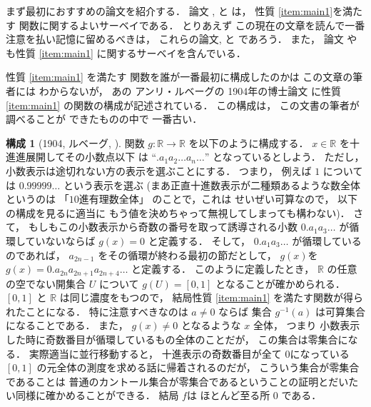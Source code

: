 \documentclass[leqno, a4paper, 12pt]{jsarticle}
\theoremstyle{definition}
\newtheorem{con}[thm]{構成}
\newcommand{\rr}{\mathbb{R}}
\begin{document}
まず最初におすすめの論文を紹介する．
論文
\cite{MR0104770}, 
\cite{MR3815388}
と
\cite{MR3293811}
は，
性質
\ref{item:main1}を満たす
関数に関するよいサーベイである．
とりあえず
この現在の文章を読んで一番注意を払い記憶に留めるべきは，
これらの論文\cite{MR0104770}, 
\cite{MR3815388}
と
\cite{MR3293811}であろう．
また，
論文
\cite{bernardi2017graphs}
や
\cite{MR3641696}
も性質
\ref{item:main1}
に関するサーベイを含んでいる．



性質
\ref{item:main1}
を満たす
関数を誰が一番最初に構成したのかは
この文章の筆者には
わからないが，
あの
アンリ・ルベーグの
1904年の博士論文
\cite{PHDLebesgue}
に性質
\ref{item:main1}
の関数の構成が記述されている．
この構成は，
この文書の筆者が調べることが
できたものの中で
一番古い．



\begin{con}[1904, ルベーグ, \cite{MR0104770}]\label{con:le}
関数
$g\colon \rr\to \rr$
を以下のように構成する．
$x\in \rr$
を十進進展開してその小数点以下
は
``$. a_{1}a_{2}\dots a_{n}\dots$''
となっているとしよう．
ただし，
小数表示は途切れない方の表示を選ぶことにする．
つまり，
例えば
$1$
については
$0. 99999\dots$
という表示を選ぶ
(まあ正直十進数表示が二種類あるような数全体というのは
「$10$進有理数全体」
のことで，これは
せいぜい可算なので，
以下の構成を見るに適当に
もう値を決めちゃって無視してしまっても構わない)．
さて，
もしもこの小数表示から奇数の番号を取って誘導される小数
$0. a_{1}a_{3}\dots$
が循環していないならば
$g(x)=0$
と定義する．
そして，
$0. a_{1}a_{3}\dots$
が循環しているのであれば，
$a_{2n-1}$
をその循環が終わる最初の節だとして，
$g(x)$を
$g(x)=0. a_{2n}a_{2n+1}a_{2n+4}\dots$
と定義する．
このように定義したとき，
$\rr$
の任意の空でない開集合
$U$
について
$g(U)=[0, 1]$
となることが確かめられる．
$[0, 1]$
と
$\rr$
は同じ濃度をもつので，
結局性質
\ref{item:main1}
を満たす関数が得られたことになる．
特に注意すべきなのは
$a\neq 0$
ならば
集合
$g^{-1}(a)$
は可算集合になることである．
また，
$g(x)\neq 0$
となるような
$x$
全体，
つまり
小数表示した時に奇数番目が循環しているもの全体のことだが，
この集合は零集合になる．
実際適当に並行移動すると，
十進表示の奇数番目が全て
$0$になっている
$[0, 1]$
の元全体の測度を求める話に帰着されるのだが，
こういう集合が零集合であることは
普通のカントール集合が零集合であるということの証明とだいたい同様に確かめることができる．
結局
$f$は
ほとんど至る所
$0$
である．
\end{con}
\end{document}
